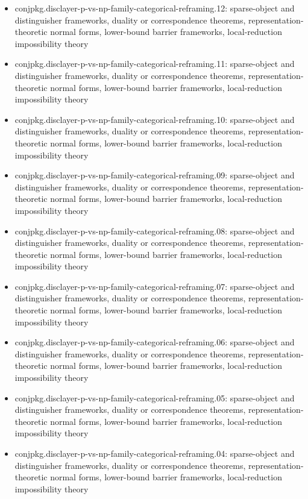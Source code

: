\documentclass[11pt]{article}
\begin{document}
\begin{itemize}
\item conjpkg.disclayer-p-vs-np-family-categorical-reframing.12: sparse-object and distinguisher frameworks, duality or correspondence theorems, representation-theoretic normal forms, lower-bound barrier frameworks, local-reduction impossibility theory
\item conjpkg.disclayer-p-vs-np-family-categorical-reframing.11: sparse-object and distinguisher frameworks, duality or correspondence theorems, representation-theoretic normal forms, lower-bound barrier frameworks, local-reduction impossibility theory
\item conjpkg.disclayer-p-vs-np-family-categorical-reframing.10: sparse-object and distinguisher frameworks, duality or correspondence theorems, representation-theoretic normal forms, lower-bound barrier frameworks, local-reduction impossibility theory
\item conjpkg.disclayer-p-vs-np-family-categorical-reframing.09: sparse-object and distinguisher frameworks, duality or correspondence theorems, representation-theoretic normal forms, lower-bound barrier frameworks, local-reduction impossibility theory
\item conjpkg.disclayer-p-vs-np-family-categorical-reframing.08: sparse-object and distinguisher frameworks, duality or correspondence theorems, representation-theoretic normal forms, lower-bound barrier frameworks, local-reduction impossibility theory
\item conjpkg.disclayer-p-vs-np-family-categorical-reframing.07: sparse-object and distinguisher frameworks, duality or correspondence theorems, representation-theoretic normal forms, lower-bound barrier frameworks, local-reduction impossibility theory
\item conjpkg.disclayer-p-vs-np-family-categorical-reframing.06: sparse-object and distinguisher frameworks, duality or correspondence theorems, representation-theoretic normal forms, lower-bound barrier frameworks, local-reduction impossibility theory
\item conjpkg.disclayer-p-vs-np-family-categorical-reframing.05: sparse-object and distinguisher frameworks, duality or correspondence theorems, representation-theoretic normal forms, lower-bound barrier frameworks, local-reduction impossibility theory
\item conjpkg.disclayer-p-vs-np-family-categorical-reframing.04: sparse-object and distinguisher frameworks, duality or correspondence theorems, representation-theoretic normal forms, lower-bound barrier frameworks, local-reduction impossibility theory

\end{itemize}
\end{document}

